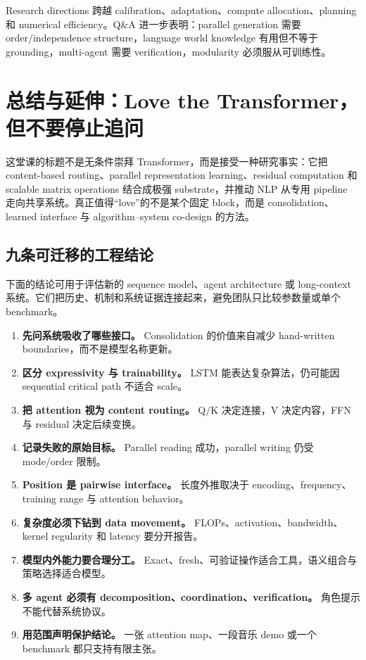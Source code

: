 \documentclass[a4paper]{article}
\begin{document}
Research directions 跨越 calibration、adaptation、compute allocation、planning 和 numerical efficiency。Q\&A 进一步表明：parallel generation 需要 order/independence structure，language world knowledge 有用但不等于 grounding，multi-agent 需要 verification，modularity 必须服从可训练性。

\section{总结与延伸：Love the Transformer，但不要停止追问}

这堂课的标题不是无条件崇拜 Transformer，而是接受一种研究事实：它把 content-based routing、parallel representation learning、residual computation 和 scalable matrix operations 结合成极强 substrate，并推动 NLP 从专用 pipeline 走向共享系统。真正值得“love”的不是某个固定 block，而是 consolidation、learned interface 与 algorithm--system co-design 的方法。

\subsection{九条可迁移的工程结论}

下面的结论可用于评估新的 sequence model、agent architecture 或 long-context 系统。它们把历史、机制和系统证据连接起来，避免团队只比较参数量或单个 benchmark。

\begin{enumerate}
  \item \textbf{先问系统吸收了哪些接口。} Consolidation 的价值来自减少 hand-written boundaries，而不是模型名称更新。
  \item \textbf{区分 expressivity 与 trainability。} LSTM 能表达复杂算法，仍可能因 sequential critical path 不适合 scale。
  \item \textbf{把 attention 视为 content routing。} Q/K 决定连接，V 决定内容，FFN 与 residual 决定后续变换。
  \item \textbf{记录失败的原始目标。} Parallel reading 成功，parallel writing 仍受 mode/order 限制。
  \item \textbf{Position 是 pairwise interface。} 长度外推取决于 encoding、frequency、training range 与 attention behavior。
  \item \textbf{复杂度必须下钻到 data movement。} FLOPs、activation、bandwidth、kernel regularity 和 latency 要分开报告。
  \item \textbf{模型内外能力要合理分工。} Exact、fresh、可验证操作适合工具，语义组合与策略选择适合模型。
  \item \textbf{多 agent 必须有 decomposition、coordination、verification。} 角色提示不能代替系统协议。
  \item \textbf{用范围声明保护结论。} 一张 attention map、一段音乐 demo 或一个 benchmark 都只支持有限主张。
\end{enumerate}
\end{document}
